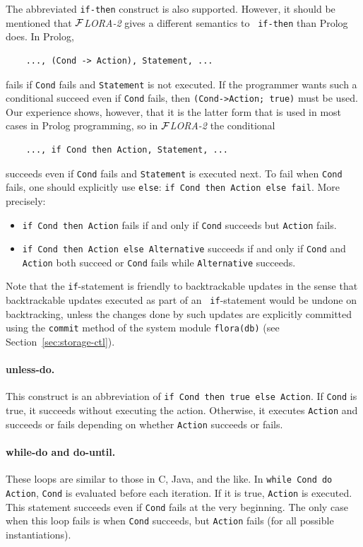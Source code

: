 \documentclass[11pt]{article}
\newcommand{\FLORA}{{\mbox{${\cal F}${\small\it LORA}\rm\emph{-2}}}\xspace}
\begin{document}
The abbreviated {\tt if-then} construct is also supported.  However, it
should be mentioned that \FLORA gives a different semantics to {\tt
  if-then} than Prolog does. In Prolog,
\begin{verbatim}
    ..., (Cond -> Action), Statement, ...  
\end{verbatim}
fails if {\tt Cond} fails and {\tt Statement} is not executed. If the
programmer wants such a conditional succeed even if {\tt Cond} fails, then
{\tt (Cond->Action; true)} must be used. Our experience shows, however,
that it is the latter form that is used in most cases in Prolog
programming, so in \FLORA the conditional
\begin{verbatim}
    ..., if Cond then Action, Statement, ...  
\end{verbatim}
succeeds even if {\tt Cond} fails and {\tt Statement} is executed next. To
fail when {\tt Cond} fails, one should explicitly use {\tt else}:
{\tt if Cond then Action else fail}. More precisely:
\begin{itemize}
  \item  {\tt if Cond then Action} fails if and only if {\tt Cond} succeeds
    but {\tt Action} fails.
  \item {\tt if Cond then Action else Alternative} succeeds if and only if 
    {\tt Cond} and {\tt Action} both succeed or {\tt Cond} fails while
    {\tt Alternative} succeeds.
\end{itemize}

Note that the {\tt if}-statement is friendly to backtrackable updates in
the sense that backtrackable updates executed as part of an {\tt
  if}-statement would be undone on backtracking, unless the changes done by
such updates are explicitly committed using the {\tt commit} method of the
system module {\tt flora(db)} (see Section~\ref{sec:storage-ctl}).

\paragraph{unless-do.}
This construct is an abbreviation of {\tt if Cond then true else Action}.
If {\tt Cond} is true, it succeeds without executing the action.
Otherwise, it executes {\tt Action} and succeeds or fails depending on
whether {\tt Action} succeeds or fails.

\paragraph{while-do and do-until.}
These loops are similar to those in C, Java, and the like.
In {\tt while Cond do Action}, {\tt Cond} is evaluated before each
iteration. If it is true, {\tt Action} is executed. This statement succeeds
even if {\tt Cond} fails at the very beginning. The only case when this
loop fails is when {\tt Cond} succeeds, but {\tt Action} fails (for all
possible instantiations).
\end{document}

